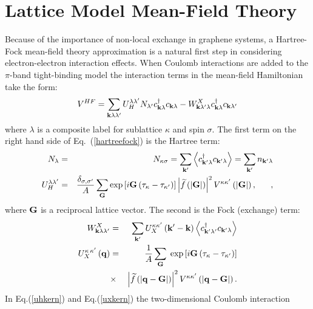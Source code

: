 \documentclass[twocolumn,prb,showpacs,preprintnumbers,amsmath,amssymb]{revtex4}
\begin{document}
\section{Lattice Model Mean-Field Theory} 
Because of the importance\cite{chiral_2d} of non-local exchange in graphene systems,
a Hartree-Fock mean-field theory approximation \cite{ostlund} is a natural first step in considering electron-electron interaction effects.
When Coulomb interactions are added to the $\pi$-band tight-binding model the interaction terms in the mean-field
Hamiltonian take the form:
\begin{eqnarray}
\label{hartreefock}
V^{HF} = \sum_{{\bf k} \lambda \lambda'} U_H^{\lambda \lambda'} N_{\lambda'} c_{{\bf k} \lambda}^{\dag} c_{{\bf k} \lambda} 
-W^{X}_{{\bf k} {\lambda' \lambda}}  c_{{\bf k} \lambda}^{\dag} c_{{\bf k} \lambda'} 
\end{eqnarray}
where $\lambda$ is a composite label for sublattice $\kappa$ and spin $\sigma$.  The first term on the right hand side
of Eq.~(\ref{hartreefock}) is the Hartree term:
\begin{eqnarray}
N_{\lambda} &=& N_{\kappa \sigma} =\sum_{{\bf k}'} \left< c^{\dag}_{{\bf k}' \lambda} c_{{\bf k}' \lambda} \right>  = \sum_{{\bf k}'} n_{{\bf k}' \lambda} \\
U_H^{\lambda \lambda'} &=&  \frac{\delta_{\sigma,\sigma'}}{A} \sum_{\bf G} \exp{\left[ i {\bf G} \left(\tau_{\kappa} - \tau_{\kappa^{\prime}} \right) \right]} 
\left| \widetilde{f}\left( \left| {\bf G}   \right|\right) \right|^2 V^{ \kappa \kappa^{\prime}} \left( \left|  {\bf G}   \right|  \right), \,\,\,\, \quad,
\label{uhkern}
\end{eqnarray}
where ${\bf G}$ is a reciprocal lattice vector.  The second is the Fock (exchange) term: 
\begin{eqnarray}
W^{X}_{{\bf k} \lambda \lambda'} &=&
 \sum_{{\bf k}'} U_X^{\kappa \kappa'} 
 \left( {\bf k}' - {\bf k} \right) 
 \left<c_{{\bf k}' \lambda'}^{\dag} c_{{\bf k}' \lambda} \right> \\ 
U_X^{\kappa \, \kappa^{\prime}} \left( {\bf q} \right) &=& \frac{1}{A} \sum_{\bf G} \; \exp{ \left[ i {\bf G} \left(\tau_{\kappa} - \tau_{\kappa^{\prime}} \right) \right]} 
\nonumber \\
&\times& \left| \widetilde{f}\left( \left| {\bf q}  -  {\bf G}  \right|\right) \right|^2 V^{ \kappa \kappa^{\prime}} \left( \left|  {\bf q} - {\bf G}  \right|  \right).
\label{uxkern}
\end{eqnarray}
In Eq.(\ref{uhkern}) and Eq.(\ref{uxkern}) the two-dimensional Coulomb interaction
\end{document}
